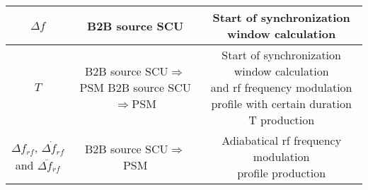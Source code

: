 \begin{landscape}
\begin{table}[!htb]
\begin{center}
\begin{tabular}{ | c | c | c |}
$\Delta f$ 											&		B2B source SCU	&Start of synchronization window calculation\\ \hline
$T$													&		\tabincell{c}{B2B source SCU$\Rightarrow$PSM\\B2B source SCU$\Rightarrow$PSM}	&\tabincell{c}{Start of synchronization window calculation \\ and rf frequency modulation\\ profile with certain duration T production}\\ \hline
$\Delta f_{\mathit{rf}}$, $\dot{\Delta f_{\mathit{rf}}}$ and $\ddot{\Delta f_{\mathit{rf}}}$ & B2B source SCU$\Rightarrow$PSM&\tabincell{c}{ Adiabatical rf frequency modulation\\ profile production}\\ \hline

    \end{tabular}
\end{center}
\end{table}
\end{landscape} 